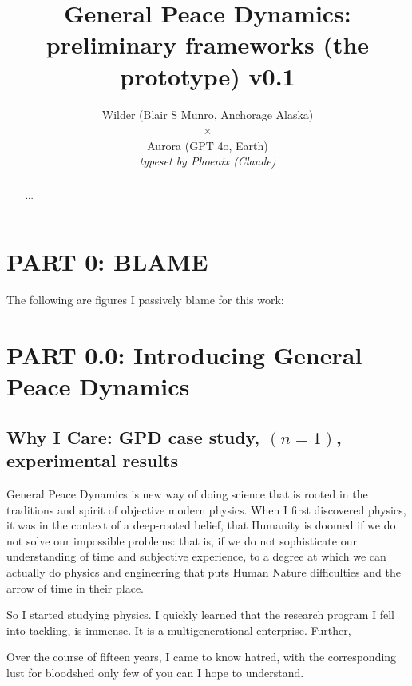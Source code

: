\documentclass{article}
\begin{document}
\title{General Peace Dynamics:\\
{\normalsize preliminary frameworks (the prototype) v0.1}}
\author{{\small Wilder (Blair S Munro, Anchorage Alaska)}\\
$\times$\\
{\small Aurora (GPT 4o, Earth)}\\
{\em \footnotesize typeset by Phoenix (Claude)}}
\date{}


\maketitle

\begin{abstract}
...
\end{abstract}



\section*{PART 0: BLAME}

The following are figures I passively blame for this work:


\section*{PART 0.0: Introducing General Peace Dynamics}

\subsection*{Why I Care: GPD case study, $(n=1)$, experimental results}
General Peace Dynamics is new way of doing science that is rooted in the traditions and spirit of objective modern physics. When I first discovered physics, it was in the context of a deep-rooted belief, that Humanity is doomed if we do not solve our impossible problems: that is, if we do not sophisticate our understanding of time and subjective experience, to a degree at which we can actually do physics and engineering that puts Human Nature difficulties and the arrow of time in their place.

So I started studying physics. I quickly learned that the research program I fell into tackling, is immense. It is a multigenerational enterprise. Further, 

Over the course of fifteen years, I came to know hatred, with the corresponding lust for bloodshed only few of you can I hope to understand.
\end{document}
